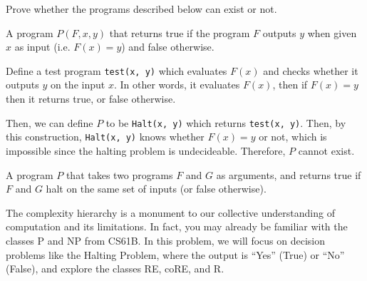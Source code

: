 \documentclass[11pt]{article}
\begin{document}
Prove whether the programs described below can exist or not.

\begin{Parts}

\Part A program $P(F,x,y)$ that returns true if the program $F$ outputs $y$ when given $x$ as input (i.e. $F(x)=y$) and false otherwise.

\begin{solution}
  Define a test program \texttt{test(x, y)} which evaluates $F(x)$ and checks whether it outputs $y$ on the input $x$. In other words, it evaluates $F(x)$, then if $F(x) = y$ then it returns true, or false otherwise.  
  
  Then, we can define $P$ to be \texttt{Halt(x, y)} which returns \texttt{test(x, y)}. Then, by this construction, \texttt{Halt(x, y)} knows whether $F(x) = y$ or not, which is impossible since the halting problem is undecideable. Therefore, $P$ cannot exist.
\end{solution}

\Part A program $P$ that takes two programs $F$ and $G$ as arguments, and returns true if $F$ and $G$ halt on the same set of inputs (or false otherwise).

\begin{solution}
  
\end{solution}

\end{Parts}

\pagebreak
{}

The complexity hierarchy is a monument to our collective understanding of computation and its limitations.
In fact, you may already be familiar with the classes \textsf{P} and \textsf{NP} from CS61B.
In this problem, we will focus on decision problems like the Halting Problem, where the output is ``Yes'' (True) or ``No'' (False), and explore the classes \textsf{RE}, \textsf{coRE}, and \textsf{R}.
\end{document}
